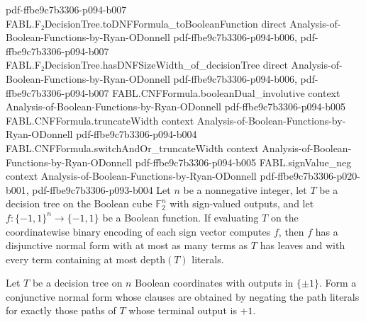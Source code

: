 \begin{theorem}
  {pdf-ffbe9c7b3306-p094-b007}
\proofstep
  {FABL.F₂DecisionTree.toDNFFormula_toBooleanFunction}
  {direct}
  {Analysis-of-Boolean-Functions-by-Ryan-ODonnell}
  {pdf-ffbe9c7b3306-p094-b006,
    pdf-ffbe9c7b3306-p094-b007}
\proofstep
  {FABL.F₂DecisionTree.hasDNFSizeWidth_of_decisionTree}
  {direct}
  {Analysis-of-Boolean-Functions-by-Ryan-ODonnell}
  {pdf-ffbe9c7b3306-p094-b006,
    pdf-ffbe9c7b3306-p094-b007}
\proofstep
  {FABL.CNFFormula.booleanDual_involutive}
  {context}
  {Analysis-of-Boolean-Functions-by-Ryan-ODonnell}
  {pdf-ffbe9c7b3306-p094-b005}
\proofstep
  {FABL.CNFFormula.truncateWidth}
  {context}
  {Analysis-of-Boolean-Functions-by-Ryan-ODonnell}
  {pdf-ffbe9c7b3306-p094-b004}
\proofstep
  {FABL.CNFFormula.switchAndOr_truncateWidth}
  {context}
  {Analysis-of-Boolean-Functions-by-Ryan-ODonnell}
  {pdf-ffbe9c7b3306-p094-b005}
\proofstep
  {FABL.signValue_neg}
  {context}
  {Analysis-of-Boolean-Functions-by-Ryan-ODonnell}
  {pdf-ffbe9c7b3306-p020-b001,
    pdf-ffbe9c7b3306-p093-b004}
Let $n$ be a nonnegative integer, let $T$ be a decision tree on the Boolean cube
$\mathbb{F}_2^n$ with sign-valued outputs, and let $f:\{−1,1\}^n\to\{−1,1\}$ be a
Boolean function. If evaluating $T$ on the coordinatewise binary encoding of each sign
vector computes $f$, then $f$ has a disjunctive normal form with at most as many terms
as $T$ has leaves and with every term containing at most $\mathrm{depth}(T)$ literals.
\end{theorem}

\begin{definition}
\leanok
{}
Let $T$ be a decision tree on $n$ Boolean coordinates with outputs in $\{\pm1\}$. Form a
conjunctive normal form whose clauses are obtained by negating the path literals for
exactly those paths of $T$ whose terminal output is $+1$.
\end{definition}

